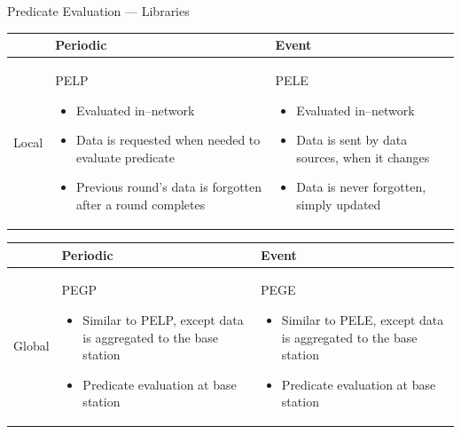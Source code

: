 \documentclass[usenames,dvipsnames]{beamer}
\begin{document}
\begin{frame}[allowframebreaks]{Predicate Evaluation --- Libraries}
\begin{table}[H]
\centering
\begin{tabular}{| m{0.9cm} | m{4.2cm} | m{4.2cm} |}
\hline
~ & \centering Periodic & \centering Event\tabularnewline
\hline
Local & PELP
	\begin{itemize}
		\item Evaluated in--network
		\item Data is requested when needed to evaluate predicate
		\item Previous round's data is forgotten after a round completes
	\end{itemize}
 & PELE
	\begin{itemize}
		\item Evaluated in--network
		\item Data is sent by data sources, when it changes
		\item Data is never forgotten, simply updated
	\end{itemize}\\
\hline
\end{tabular}
\end{table}

\begin{table}[H]
\centering
\begin{tabular}{| m{0.9cm} | m{4.2cm} | m{4.2cm} |}
\hline
~ & \centering Periodic & \centering Event\tabularnewline
\hline
Global & PEGP
	\begin{itemize}
		\item Similar to PELP, except data is aggregated to the base station
		\item Predicate evaluation at base station
	\end{itemize}
 & PEGE
	\begin{itemize}
		\item Similar to PELE, except data is aggregated to the base station
		\item Predicate evaluation at base station
	\end{itemize}\\
\hline
\end{tabular}
\end{table}
\end{frame}
\end{document}
